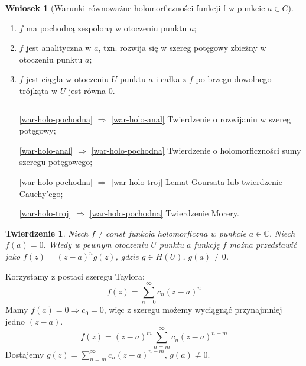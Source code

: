\documentclass[11pt]{article}
\theoremstyle{plain}
\newtheorem*{theorem}{Twierdzenie}
\theoremstyle{definition}
\newtheorem*{corollary}{Wniosek}
\theoremstyle{remark}
\let\oldendproof\endproof
\renewenvironment{proof}[1][\proofname]{
  \oldproof[\textsc{\small #1}]
}{\oldendproof}
\begin{document}
\begin{corollary}[Warunki równoważne holomorficzności funkcji f w punkcie $ a \in C $]
  $ $
  \begin{enumerate}
    \item $ f $ ma pochodną zespoloną w otoczeniu punktu $ a $; \label{war-holo-pochodna}
    \item $ f $ jest analityczna w $ a $, tzn. rozwija się w szereg potęgowy zbieżny w otoczeniu punktu $ a $; \label{war-holo-anal}
    \item $ f $ jest ciągła w otoczeniu $ U $ punktu $ a $ i całka z $ f $ po brzegu dowolnego trójkąta w $ U $ jest równa $ 0 $. \label{war-holo-troj}
  \end{enumerate}
\end{corollary}

\begin{proof}
  $ $
  \begin{enumerate}[leftmargin=5.1em]
    \item[\ref{war-holo-pochodna} $ \Rightarrow $ \ref{war-holo-anal}]%
    Twierdzenie o rozwijaniu w szereg potęgowy;

    \item[\ref{war-holo-anal} $ \Rightarrow $ \ref{war-holo-pochodna}]
    Twierdzenie o holomorficzności sumy szeregu potęgowego;

    \item[\ref{war-holo-pochodna} $ \Rightarrow $ \ref{war-holo-troj}]
    Lemat Goursata lub twierdzenie Cauchy’ego;

    \item[\ref{war-holo-troj} $ \Rightarrow $ \ref{war-holo-pochodna}]
    Twierdzenie Morery.
  \end{enumerate}
\end{proof}

\begin{theorem}
  Niech $ f \neq const $ funkcja holomorficzna w punkcie $ a \in \mathbb{C} $.
  Niech $ f(a) = 0 $.
  Wtedy w pewnym otoczeniu $ U $ punktu $ a $ funkcję $ f $ można przedstawić jako $ f(z) = (z-a)^{n}g(z) $,
  gdzie $ g \in H(U) $, $ g(a) \neq 0 $.
\end{theorem}

\begin{proof}
  Korzystamy z postaci szeregu Taylora:
  $$ f(z) = \sum_{n=0}^{\infty} c_n(z-a)^n $$
  Mamy $ f(a) = 0 \Rightarrow c_0 = 0 $, więc z szeregu możemy wyciągnąć przynajmniej jedno $ (z-a) $.
  $$ f(z) = (z-a)^m \sum_{n=m}^{\infty} c_n(z-a)^{n-m} $$
  Dostajemy $ g(z) = \sum_{n=m}^{\infty} c_n(z-a)^{n-m} $, $ g(a) \neq 0 $.
\end{proof}
\end{document}
